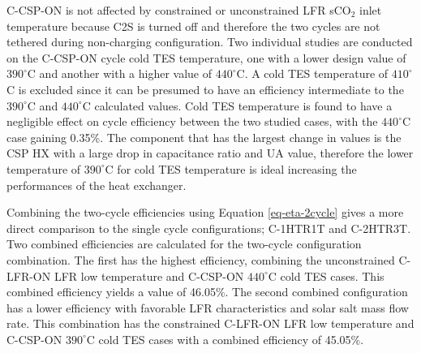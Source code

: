 \begin{paracol}{2}
C-CSP-ON is not affected by constrained or unconstrained LFR sCO$_2$ inlet temperature because C2S is turned off and therefore the two cycles are not tethered during non-charging configuration. Two individual studies are conducted on the C-CSP-ON cycle cold TES temperature, one with a lower design value of $390^{\circ}$C and another with a higher value of $440^{\circ}$C. A cold TES temperature of $410^{\circ}$C is excluded since it can be presumed to have an efficiency intermediate to the $390^{\circ}$C and $440^{\circ}$C calculated values. Cold TES temperature is found to have a negligible effect on cycle efficiency between the two studied cases, with the $440^{\circ}$C case gaining 0.35\%. The component that has the largest change in values is the CSP HX with a large drop in capacitance ratio and UA value, therefore the lower temperature of $390^{\circ}$C for cold TES temperature is ideal increasing the performances of the heat exchanger. 

Combining the two-cycle efficiencies using Equation \ref{eq-eta-2cycle} gives a more direct comparison to the single cycle configurations; C-1HTR1T and C-2HTR3T. Two combined efficiencies are calculated for the two-cycle configuration combination. The first has the highest efficiency, combining the unconstrained C-LFR-ON LFR low temperature and C-CSP-ON $440^{\circ}$C cold TES cases. This combined efficiency yields a value of 46.05\%. The second combined configuration has a lower efficiency with favorable LFR characteristics and solar salt mass flow rate. This combination has the constrained C-LFR-ON LFR low temperature and C-CSP-ON $390^{\circ}$C cold TES cases with a combined efficiency of 45.05\%. 



\end{paracol}
